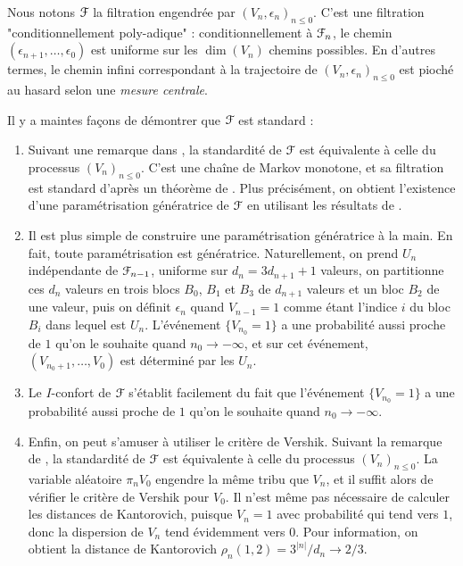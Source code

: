 \documentclass[12pt,a4paper]{article}
\begin{document}
Nous notons $\EuScript{F}$ la filtration engendrée par ${(V_n, \epsilon_n)}_{n \leq 0}$. 
C'est une filtration "conditionnellement poly-adique" :  
conditionnellement à $\EuScript{F}_n$, le chemin $(\epsilon_{n+1}, \ldots, \epsilon_0)$ 
est uniforme sur les $\dim(V_n)$ chemins possibles. 
En d'autres termes, le chemin infini correspondant à la trajectoire 
de ${(V_n, \epsilon_n)}_{n \leq 0}$ est pioché au hasard selon une \emph{mesure centrale}. 

Il y a maintes façons de démontrer que $\EuScript{F}$ est standard :

\begin{enumerate}
\item Suivant une remarque dans \cite{JLR}, la standardité de $\EuScript{F}$ est équivalente 
à celle du processus ${(V_n)}_{n \leq 0}$. C'est une chaîne de Markov monotone, 
 et sa filtration est standard d'après un théorème de \cite{JLR}. 
 Plus précisément, on obtient l'existence d'une paramétrisation 
 génératrice de $\EuScript{F}$ en utilisant les résultats de \cite{JLR}.
 
\item Il est plus simple de construire une paramétrisation génératrice à la main. 
En fait, toute paramétrisation est génératrice. 
Naturellement, on prend $U_n$ indépendante de $\EuScript{F}_{n-1}$, uniforme sur 
$d_n = 3d_{n+1} +1$ valeurs,  
on partitionne ces $d_n$ valeurs en trois blocs $B_0$, $B_1$ et $B_3$ de $d_{n+1}$ valeurs 
et un bloc $B_2$ de une valeur, puis on définit $\epsilon_n$ quand $V_{n-1}=1$ 
comme étant l'indice $i$ du bloc $B_i$ dans lequel est $U_n$. 
L'événement $\{V_{n_0}=1\}$ a une probabilité aussi proche de $1$ qu'on le souhaite quand 
${n_0} \to -\infty$, et sur cet événement, $(V_{n_0+1}, \ldots, V_0)$ est 
déterminé par les $U_n$. 
 
\item Le $I$-confort de $\EuScript{F}$ s'établit facilement du fait que 
l'événement $\{V_{n_0}=1\}$ a une probabilité aussi proche de $1$ qu'on le souhaite quand 
${n_0} \to -\infty$. 

\item Enfin, on peut s'amuser à utiliser le critère de Vershik. 
Suivant la remarque de \cite{JLR}, la standardité de $\EuScript{F}$ est équivalente 
à celle du processus ${(V_n)}_{n \leq 0}$. La variable aléatoire $\pi_n V_0$ 
engendre la même tribu que $V_n$, et il suffit alors de vérifier le critère 
de Vershik pour $V_0$. Il n'est même pas nécessaire de calculer 
les distances de Kantorovich, puisque $V_n=1$ avec probabilité qui tend vers 
$1$, donc la dispersion de $V_n$ tend évidemment vers $0$. 
Pour information, on obtient la distance de Kantorovich 
$\rho_n(1,2)=3^{|n|}/d_n \to 2/3$. 
\end{enumerate}
\end{document}
